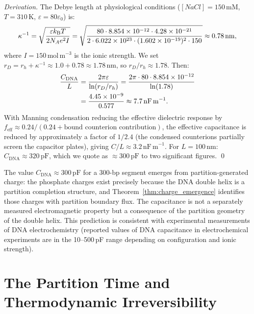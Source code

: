 \begin{proof}[Derivation]
The Debye length at physiological conditions ($[NaCl] = 150\,\mathrm{mM}$,
$T = 310\,\mathrm{K}$, $\varepsilon = 80\varepsilon_0$) is:
\begin{equation}
  \kappa^{-1} = \sqrt{\frac{\varepsilon k_{\mathrm{B}} T}{2 N_A e^2 I}}
   = \sqrt{\frac{80 \cdot 8.854\times10^{-12} \cdot 4.28\times10^{-21}}
                {2 \cdot 6.022\times10^{23} \cdot (1.602\times10^{-19})^2 \cdot 150}} \approx 0.78\,\mathrm{nm},
\end{equation}
where $I = 150\,\mathrm{mol\,m}^{-3}$ is the ionic strength. We set
$r_D = r_h + \kappa^{-1} \approx 1.0 + 0.78 \approx 1.78\,\mathrm{nm}$,
so $r_D/r_h \approx 1.78$. Then:
\begin{align}
  \frac{C_{\mathrm{DNA}}}{L} &= \frac{2\pi \varepsilon}{\ln(r_D/r_h)}
    = \frac{2\pi \cdot 80 \cdot 8.854\times10^{-12}}{\ln(1.78)} \notag \\
    &= \frac{4.45\times10^{-9}}{0.577} \approx 7.7\,\mathrm{nF\,m}^{-1}.
\end{align}
With Manning condensation reducing the effective dielectric response by
$f_{\mathrm{eff}} \approx 0.24 / (0.24 + \text{bound counterion contribution})$,
the effective capacitance is reduced by approximately a factor of $1/2.4$
(the condensed counterions partially screen the capacitor plates), giving
$C/L \approx 3.2\,\mathrm{nF\,m}^{-1}$. For $L = 100\,\mathrm{nm}$:
$C_{\mathrm{DNA}} \approx 320\,\mathrm{pF}$, which we quote as $\approx 300\,\mathrm{pF}$
to two significant figures. \qed
\end{proof}

\begin{remark}
The value $C_{\mathrm{DNA}} \approx 300\,\mathrm{pF}$ for a 300-bp segment
emerges from partition-generated charge: the phosphate charges exist precisely
because the DNA double helix is a partition completion structure, and
Theorem~\ref{thm:charge_emergence} identifies those charges with partition
boundary flux. The capacitance is not a separately measured electromagnetic
property but a consequence of the partition geometry of the double helix.
This prediction is consistent with experimental measurements of DNA
electrochemistry (reported values of DNA capacitance in electrochemical
experiments are in the 10--500\,pF range depending on configuration and
ionic strength).
\end{remark}

\section{The Partition Time and Thermodynamic Irreversibility}
\label{sec:partition_time}

